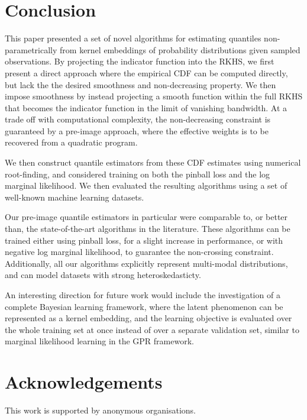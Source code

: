 \documentclass[twoside]{article} \usepackage{aistats2017}
\theoremstyle{definition}
\theoremstyle{theorem}
\begin{document}
\section{Conclusion}
\label{sec:conclusion}
	
	This paper presented a set of novel algorithms for estimating quantiles non-parametrically from kernel embeddings of probability distributions given sampled observations. By projecting the indicator function into the RKHS, we first present a direct approach where the empirical CDF can be computed directly, but lack the the desired smoothness and non-decreasing property. We then impose smoothness by instead projecting a smooth function within the full RKHS that becomes the indicator function in the limit of vanishing bandwidth. At a trade off with computational complexity, the non-decreasing constraint is guaranteed by a pre-image approach, where the effective weights is to be recovered from a quadratic program.
	
	We then construct quantile estimators from these CDF estimates using numerical root-finding, and considered training on both the pinball loss and the log marginal likelihood. We then evaluated the resulting algorithms using a set of well-known machine learning datasets.
	
	Our pre-image quantile estimators in particular were comparable to, or better than, the state-of-the-art algorithms in the literature. These algorithms can be trained either using pinball loss, for a slight increase in performance, or with negative log marginal likelihood, to guarantee the non-crossing constraint. Additionally, all our algorithms explicitly represent multi-modal distributions, and can model datasets with strong heteroskedasticty.
	
	An interesting direction for future work would include the investigation of a complete Bayesian learning framework, where the latent phenomenon can be represented as a kernel embedding, and the learning objective is evaluated over the whole training set at once instead of over a separate validation set, similar to marginal likelihood learning in the GPR framework.

\section*{Acknowledgements}

	This work is supported by anonymous organisations.


\end{document}
